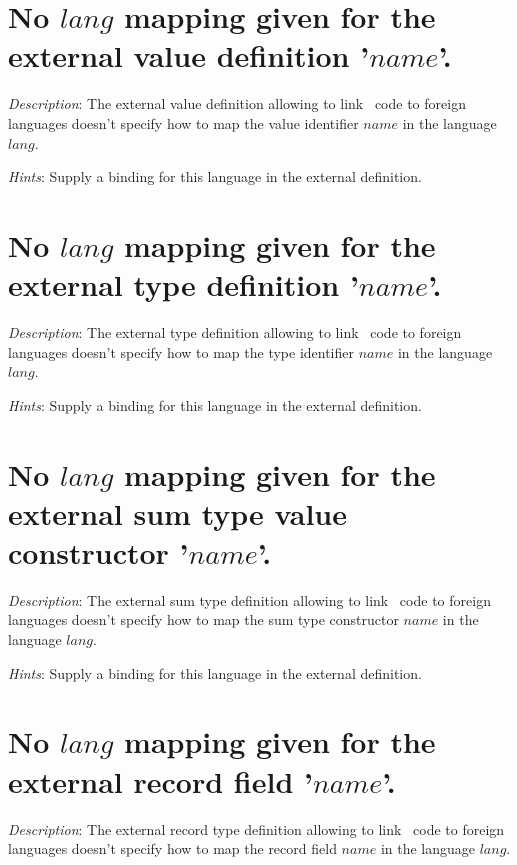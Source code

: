 \section*{No $lang$ mapping given for the external value definition
  '$name$'.}

{\em Description}: The external value definition allowing to link
\focal\ code to foreign languages doesn't specify how to map the value
identifier $name$ in the language $lang$.

{\em Hints}: Supply a binding for this language in the external
definition.



\section*{No $lang$ mapping given for the external type definition
  '$name$'.}

{\em Description}: The external type definition allowing to link
\focal\ code to foreign languages doesn't specify how to map the type
identifier $name$ in the language $lang$.

{\em Hints}: Supply a binding for this language in the external
definition.



\section*{No $lang$ mapping given for the external sum type value
  constructor '$name$'.}

{\em Description}: The external sum type definition allowing to link
\focal\ code to foreign languages doesn't specify how to map the sum
type constructor $name$ in the language $lang$.

{\em Hints}: Supply a binding for this language in the external
definition.



\section*{No $lang$ mapping given for the external record field
  '$name$'.}

{\em Description}: The external record type definition allowing to
link \focal\ code to foreign languages doesn't specify how to map the
record field $name$ in the language $lang$.

